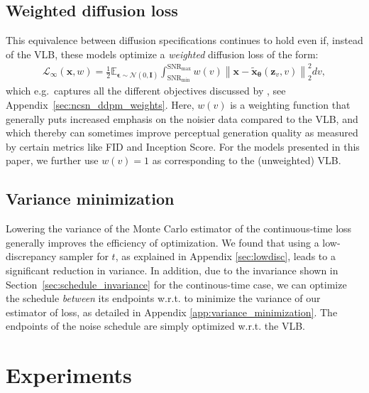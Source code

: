 \documentclass{article}
\def\rvx{{\mathbf{x}}}
\def\rvz{{\mathbf{z}}}
\newcommand{\E}{\mathbb{E}}
\newcommand{\bT}{{\boldsymbol{\theta}}}
\newcommand{\bfI}{\mathbf{I}}
\newcommand{\bepsilon}{{\boldsymbol{\epsilon}}}
\newcommand{\snr}{\text{SNR}}
\begin{document}
\subsection{Weighted diffusion loss}
This equivalence between diffusion specifications continues to hold even if, instead of the VLB, these models optimize a \emph{weighted} diffusion loss of the form:
\begin{align}
\mathcal{L}_{\infty}(\rvx, w) = \frac{1}{2}\E_{\bepsilon\sim\mathcal{N}(0,\bfI)} \int_{\snr_{\text{min}}}^{\snr_{\text{max}}} w(v) \left\rVert \rvx - \tilde{\rvx}_{\bT}(\rvz_v, v) \right\lVert_{2}^{2} dv,
\label{eq:weighted_diff}
\end{align}
which e.g.\ captures all the different objectives discussed by \cite{song2020score}, see Appendix~\ref{sec:ncsn_ddpm_weights}. Here, $w(v)$ is a weighting function that generally puts increased emphasis on the noisier data compared to the VLB, and which thereby can sometimes improve perceptual generation quality as measured by certain metrics like FID and Inception Score. For the models presented in this paper, we further use $w(v)=1$ as corresponding to the (unweighted) VLB. 
















\subsection{Variance minimization}

Lowering the variance of the Monte Carlo estimator of the continuous-time loss generally improves the efficiency of optimization. We found that using a low-discrepancy sampler for $t$, as explained in Appendix \ref{sec:lowdisc}, leads to a significant reduction in variance. In addition, due to the invariance shown in Section~\ref{sec:schedule_invariance} for the continous-time case, we can optimize the schedule \emph{between} its endpoints w.r.t. to minimize the variance of our estimator of loss, as detailed in Appendix \ref{app:variance_minimization}. The endpoints of the noise schedule are simply optimized w.r.t. the VLB. 

\section{Experiments}
\label{sec:experiments}
\end{document}
